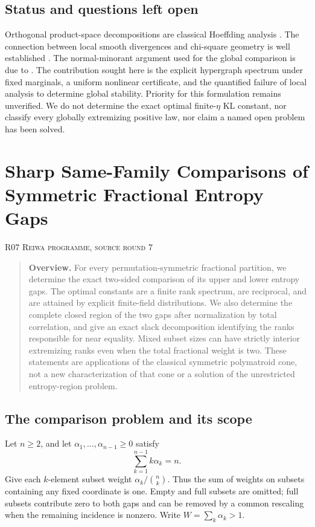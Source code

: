 \documentclass[11pt,a4paper]{article}
\theoremstyle{definition}\newtheorem{definition}[theorem]{Definition}
\theoremstyle{remark}\newtheorem{remark}[theorem]{Remark}
\numberwithin{equation}{section}
\begin{document}
\subsection{Status and questions left open}\label{R06-sec-6}
Orthogonal product-space decompositions are classical Hoeffding analysis \cite{ref069}. The connection between local smooth divergences and chi-square geometry is well established \cite{ref070,ref071}. The normal-minorant argument used for the global comparison is due to \cite{ref067}. The contribution sought here is the explicit hypergraph spectrum under fixed marginals, a uniform nonlinear certificate, and the quantified failure of local analysis to determine global stability. Priority for this formulation remains unverified. We do not determine the exact optimal finite-$\eta$ KL constant, nor classify every globally extremizing positive law, nor claim a named open problem has been solved.




\clearpage
\section[R07 --- Sharp Same-Family Comparisons of Symmetric Fractional Entropy Gaps]{Sharp Same-Family Comparisons of Symmetric Fractional Entropy Gaps}\label{contrib-R07}
\noindent\textsc{R07 \quad Reiwa programme, source round 7}\par\medskip


\begin{quote}\small\textbf{Overview.} For every permutation-symmetric fractional partition, we determine the exact two-sided comparison of its upper and lower entropy gaps. The optimal constants are a finite rank spectrum, are reciprocal, and are attained by explicit finite-field distributions. We also determine the complete closed region of the two gaps after normalization by total correlation, and give an exact slack decomposition identifying the ranks responsible for near equality. Mixed subset sizes can have strictly interior extremizing ranks even when the total fractional weight is two. These statements are applications of the classical symmetric polymatroid cone, not a new characterization of that cone or a solution of the unrestricted entropy-region problem.\end{quote}

\subsection{The comparison problem and its scope}\label{R07-sec-1}
Let $n\ge2$, and let $\alpha_1,\ldots,\alpha_{n-1}\ge0$ satisfy
\begin{equation}\label{R07-cover}\sum_{k=1}^{n-1}k\alpha_k=n.\end{equation}
Give each $k$-element subset weight $\alpha_k/\binom nk$. Thus the sum of weights on subsets containing any fixed coordinate is one. Empty and full subsets are omitted; full subsets contribute zero to both gaps and can be removed by a common rescaling when the remaining incidence is nonzero. Write $W=\sum_k\alpha_k>1$.
\end{document}
